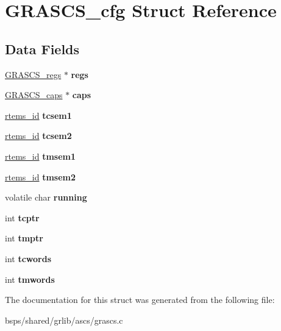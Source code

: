 \hypertarget{structGRASCS__cfg}{}\section{G\+R\+A\+S\+C\+S\+\_\+cfg Struct Reference}
\label{structGRASCS__cfg}
\subsection*{Data Fields}
\begin{DoxyCompactItemize}
\item 
\mbox{\label{structGRASCS__cfg_a51deb5eb8ee9e8a1de6968abdd0e7a9b}} 
\mbox{\hyperlink{structGRASCS__regs}{G\+R\+A\+S\+C\+S\+\_\+regs}} $\ast$ {\bfseries regs}
\item 
\mbox{\label{structGRASCS__cfg_abaf8d49d4c307c3664f0c774a3aa06e1}} 
\mbox{\hyperlink{structGRASCS__caps}{G\+R\+A\+S\+C\+S\+\_\+caps}} $\ast$ {\bfseries caps}
\item 
\mbox{\label{structGRASCS__cfg_a708999228e254b555d1891914094a155}} 
\mbox{\hyperlink{group__ClassicTasks_gab20892b814dced7dd4e5b9bf42becd57}{rtems\+\_\+id}} {\bfseries tcsem1}
\item 
\mbox{\label{structGRASCS__cfg_ad2b2a1a32cf675aaa8aaecac38e4f7c7}} 
\mbox{\hyperlink{group__ClassicTasks_gab20892b814dced7dd4e5b9bf42becd57}{rtems\+\_\+id}} {\bfseries tcsem2}
\item 
\mbox{\label{structGRASCS__cfg_a1a7f71bf0a8989dec4b802a76d3f11d9}} 
\mbox{\hyperlink{group__ClassicTasks_gab20892b814dced7dd4e5b9bf42becd57}{rtems\+\_\+id}} {\bfseries tmsem1}
\item 
\mbox{\label{structGRASCS__cfg_aeff66ea2200ed869eb7d06b702d4f9cc}} 
\mbox{\hyperlink{group__ClassicTasks_gab20892b814dced7dd4e5b9bf42becd57}{rtems\+\_\+id}} {\bfseries tmsem2}
\item 
\mbox{\label{structGRASCS__cfg_aadff7cace423b146e1319be0cd879e4d}} 
volatile char {\bfseries running}
\item 
\mbox{\label{structGRASCS__cfg_a8a54e1f6a37d0645256d0cf2def7f735}} 
int {\bfseries tcptr}
\item 
\mbox{\label{structGRASCS__cfg_af180d0595650c8ef676bfa9c036fcbda}} 
int {\bfseries tmptr}
\item 
\mbox{\label{structGRASCS__cfg_af3d1184ea9201ffaca31363d3df35423}} 
int {\bfseries tcwords}
\item 
\mbox{\label{structGRASCS__cfg_a074bbecfb331622f33596605466a1042}} 
int {\bfseries tmwords}
\end{DoxyCompactItemize}


The documentation for this struct was generated from the following file\+:\begin{DoxyCompactItemize}
\item 
bsps/shared/grlib/ascs/grascs.\+c\end{DoxyCompactItemize}
